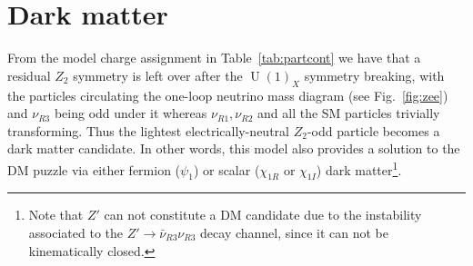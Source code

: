 \documentclass[12pt]{article}
\begin{document}

%
%
%
%
%

\section{Dark matter}
\label{sec:DM}
From the model charge assignment in Table~\ref{tab:partcont} we have that a residual $Z_2$ symmetry is left over after the $\operatorname{U}(1)_X$ symmetry breaking, with the particles circulating the one-loop neutrino mass diagram  (see Fig.~\ref{fig:zee}) and $\nu_{R3}$ being odd under it whereas $\nu_{R1}, \nu_{R2}$ and all the SM particles trivially transforming. Thus the lightest electrically-neutral $Z_2$-odd particle becomes a dark matter candidate. In other words, this model also provides a solution to the DM puzzle via either fermion ($\psi_1$) or scalar ($\chi_{1R}$ or $\chi_{1I}$) dark matter\footnote{Note that $Z'$ can not constitute a DM candidate due to the instability associated to the $Z'\to\bar{\nu}_{R3}\nu_{R3}$ decay channel, since it can not be kinematically closed.}. 
\end{document}
